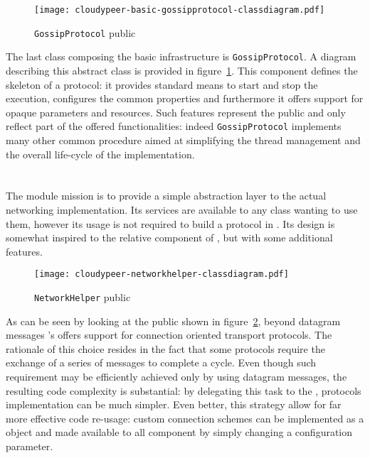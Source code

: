 \begin{figure}[h!]
  \centering
  \texttt{[image: cloudypeer-basic-gossipprotocol-classdiagram.pdf]}
  \caption{\texttt{GossipProtocol} public \api}
  \label{fig:cloudypeer-gossipprotocol-class}
\end{figure}

The last class composing the basic infrastructure is
\texttt{GossipProtocol}. A diagram describing this abstract class is
provided in figure~\ref{fig:cloudypeer-gossipprotocol-class}. This
component defines the skeleton of a \gossip protocol: it provides
standard means to start and stop the execution, configures the common
properties and furthermore it offers support for opaque parameters
and resources. Such features represent the public \api and
only reflect part of the offered functionalities: indeed
\texttt{GossipProtocol} implements many other common procedure aimed at
simplifying the thread management and the overall life-cycle of the
implementation.

\section{\networkhelper}
The \networkhelper module mission is to provide a simple abstraction
layer to the actual networking implementation. Its services are
available to any class wanting to use them, however its usage is not
required to build a protocol in \cloudypeer. Its design is somewhat
inspired to the relative component of \grapes, but with some
additional features.

\begin{figure}[h!]
  \centering
  \texttt{[image: cloudypeer-networkhelper-classdiagram.pdf]}
  \caption{\texttt{NetworkHelper} public \api}
  \label{fig:cloudypeer-nethelper-class}
\end{figure}

As can be seen by looking at the public \api shown in
figure~\ref{fig:cloudypeer-nethelper-class}, beyond datagram messages
\cloudypeer's \networkhelper offers support for connection oriented
transport protocols. The rationale of this choice resides in the fact
that some \ptop protocols require the exchange of a series of messages
to complete a cycle. Even though such requirement may be efficiently
achieved only by using datagram messages, the resulting code complexity is
substantial: by delegating this task to the \networkhelper, protocols
implementation can be much simpler. Even better, this strategy allow
for far more effective code re-usage: custom connection schemes can be
implemented as a \networkhelper object and made available to
all \cloudypeer component by simply changing a configuration parameter.

